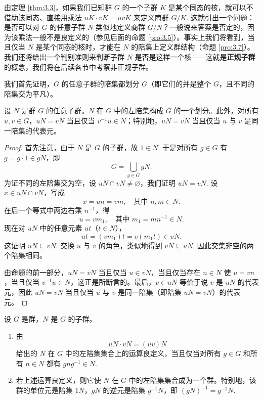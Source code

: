 由定理 \ref{thm:3.3}，如果我们已知群 \(G\) 的一个子群 \(K\) 是某个同态的核，就可以不借助该同态、直接用乘法 \(uK \cdot vK = uvK\) 来定义商群 \(G/K\). 这就引出一个问题：是否可以对 \(G\) 的任意子群 \(N\) 类似地定义商群 \(G/N\)？一般说来答案是否定的，因为该乘法一般不是良定义的（参见后面的命题 \ref{pro:3.5}）。事实上我们将看到，当且仅当 \(N\) 是某个同态的核时，才能在 \(N\) 的陪集上定义群结构（命题 \ref{pro:3.7}）。我们还将给出一个判别准则来判断子群 \(N\) 是否是这样一个核——这就是\textbf{正规子群}的概念，我们将在后续各节中考察非正规子群。

我们首先证明，\(G\) 的任意子群的陪集都划分 \(G\)（即它们的并是整个 \(G\)，且不同的陪集交为平凡）。

\begin{proposition}\label{pro:3.4}
设 \(N\) 是群 \(G\) 的任意子群。\(N\) 在 \(G\) 中的左陪集构成 \(G\) 的一个划分。此外，对所有 \(u, v \in G\)，\(uN = vN\) 当且仅当 \(v^{-1}u \in N\)；特别地，\(uN = vN\) 当且仅当 \(u\) 与 \(v\) 是同一陪集的代表元。
\end{proposition}

\begin{proof}
首先注意，由于 \(N\) 是 \(G\) 的子群，故 \(1 \in N\). 于是对所有 \(g \in G\) 有 \(g = g \cdot 1 \in gN\)，即
\[
G = \bigcup_{g \in G} gN.
\]
为证不同的左陪集交为空，设 \(uN \cap vN \neq \varnothing\)，我们证明 \(uN = vN\). 设 \(x \in uN \cap vN\)，写成
\[
x = un = vm, \quad \text{其中 } n, m \in N.
\]
在后一个等式中两边右乘 \(n^{-1}\)，得
\[
u = vm_1, \quad \text{其中 } m_1 = mn^{-1} \in N.
\]
现在对 \(uN\) 中的任意元素 \(ut\)（\(t \in N\)），
\[
ut = (vm_1)t = v(m_1 t) \in vN.
\]
这证明 \(uN \subseteq vN\). 交换 \(u\) 与 \(v\) 的角色，类似地得到 \(vN \subseteq uN\). 因此交集非空的两个陪集相同。

由命题的前一部分，\(uN = vN\) 当且仅当 \(u \in vN\)，当且仅当存在 \(n \in N\) 使 \(u = vn\)，当且仅当 \(v^{-1}u \in N\)，这正是所断言的。最后，\(v \in uN\) 等价于说 \(v\) 是 \(uN\) 的代表元，因此 \(uN = vN\) 当且仅当 \(u\) 与 \(v\) 是同一陪集（即陪集 \(uN = vN\)）的代表元。
\end{proof}

\begin{proposition}\label{pro:3.5}
设 \(G\) 是群，\(N\) 是 \(G\) 的子群。

\begin{enumerate}[label=(\arabic*)]
\item 由
\[
uN \cdot vN = (uv)N
\]
给出的 \(N\) 在 \(G\) 中的左陪集集合上的运算良定义，当且仅当对所有 \(g \in G\) 和所有 \(n \in N\) 都有 \(gng^{-1} \in N\).

\item 若上述运算良定义，则它使 \(N\) 在 \(G\) 中的左陪集集合成为一个群。特别地，该群的单位元是陪集 \(1N\)，\(gN\) 的逆元是陪集 \(g^{-1}N\)，即 \((gN)^{-1} = g^{-1}N\).
\end{enumerate}
\end{proposition}

